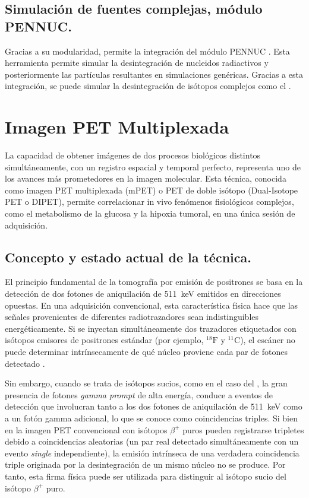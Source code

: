 \subsection{Simulación de fuentes complejas, módulo PENNUC.}

Gracias a su modularidad, \penred permite la integración del módulo PENNUC \cite{Garca-Torao2019}. Esta herramienta permite simular la desintegración de nucleidos radiactivos y posteriormente las partículas resultantes en simulaciones genéricas. Gracias a esta integración, se puede simular la desintegración de isótopos complejos como el \yochoseis.

\section{Imagen PET Multiplexada}
\label{sec:estado_del_arte_fund_teoricos:multiplexing}


La capacidad de obtener imágenes de dos procesos biológicos distintos simultáneamente, con un registro espacial y temporal perfecto, representa uno de los avances más prometedores en la imagen molecular. Esta técnica, conocida como imagen PET multiplexada (mPET) o PET de doble isótopo (Dual-Isotope PET o DIPET\cite{Andreyev2011}), permite correlacionar in vivo fenómenos fisiológicos complejos, como el metabolismo de la glucosa y la hipoxia tumoral, en una única sesión de adquisición.

\subsection{Concepto y estado actual de la técnica.}

El principio fundamental de la tomografía por emisión de positrones se basa en la detección de dos fotones de aniquilación de \SI{511}{\keV} emitidos en direcciones opuestas. En una adquisición convencional, esta característica física hace que las señales provenientes de diferentes radiotrazadores sean indistinguibles energéticamente. Si se inyectan simultáneamente dos trazadores etiquetados con isótopos emisores de positrones estándar (por ejemplo, $^{18}\text{F}$ y $^{11}\text{C}$), el escáner no puede determinar intrínsecamente de qué núcleo proviene cada par de fotones detectado \parencite{Andreyev2011}.

Sin embargo, cuando se trata de isótopos sucios, como en el caso del \yochoseis, la gran presencia de fotones \textit{gamma prompt} de alta energía, conduce a eventos de detección
que involucran tanto a los dos fotones de aniquilación de \SI{511}{\keV} como a un fotón gamma adicional, lo que se conoce como coincidencias triples. Si bien en la imagen PET convencional con isótopos $\beta^+$ puros pueden registrarse tripletes debido a coincidencias aleatorias (un par real detectado simultáneamente con un evento \emph{single} independiente), la emisión intrínseca de una verdadera coincidencia triple originada por la desintegración de un mismo núcleo no se produce. Por tanto, esta firma física puede ser utilizada para distinguir al isótopo sucio del isótopo $\beta^+$ puro.

